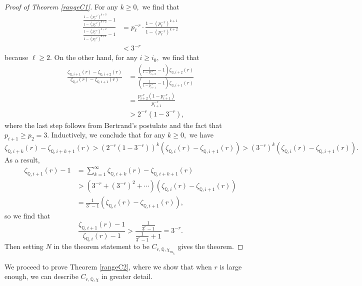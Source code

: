 \documentclass[12pt]{amsart}
\theoremstyle{definition}
\numberwithin{equation}{section}
\newcommand{\Q}{\mathbb{Q}}
\begin{document}
\begin{proof}[Proof of Theorem \ref{rangeC1}]
    For any $k \geq 0,$ we find that \begin{align*}
        \frac{ \frac{1 - (p_\ell^{-r})^{k+3}}{1 - (p_\ell^{-r})^{k+2}} - 1}{\frac{1 - (p_\ell^{-r})^{k+2}}{1 - (p_\ell^{-r})^{k+1}} - 1} 
        &= p_\ell^{-r} \cdot \frac{1 - (p_\ell^{-r})^{k+1} }{1 - (p_\ell^{-r})^{k+2}} \\
        &< 3^{-r}
    \end{align*} because $\ell \geq 2.$
    On the other hand, for any $i \geq i_0,$ we find that 
    \begin{align*}
        \frac{\zeta_{\Q,i+1}(r) - \zeta_{\Q,i+2}(r)}{\zeta_{\Q,i}(r) - \zeta_{\Q,i+1}(r)} &= \frac{ \left( \frac{1}{1-p_{i+2}^{-r}} -  1 \right) \zeta_{\Q,i+2}(r) }{  \left( \frac{1}{1-p_{i+1}^{-r}} -  1 \right) \zeta_{\Q,i+1}(r)  }\\
        &= \frac{p_{i+2}^{-r} (1 - p_{i+1}^{-r})}{p_{i+1}^{-r}} \\
        &> 2^{-r}(1 - 3^{-r}),
    \end{align*}
    where the last step follows from Bertrand's postulate and the fact that $p_{i+1} \geq p_2 = 3$. Inductively, we conclude that for any $k \geq 0,$ we have $$\zeta_{\Q,i+k}(r) - \zeta_{\Q,i+k+1}(r) > (2^{-r} (1 - 3^{-r}) )^k (\zeta_{\Q,i}(r) - \zeta_{\Q,i+1}(r)) > (3^{-r} )^k (\zeta_{\Q,i}(r) - \zeta_{\Q,i+1}(r)).$$ As a result, \begin{align*}
        \zeta_{\Q,i+1}(r) - 1 &= \sum_{k=1}^\infty \zeta_{\Q,i+k}(r) - \zeta_{\Q,i+k+1}(r) \\&> (3^{-r} + (3^{-r})^2 + \cdots ) (\zeta_{\Q,i}(r) - \zeta_{\Q,i+1}(r)) \\ &= \frac{1}{3^r - 1} (\zeta_{\Q,i}(r) - \zeta_{\Q,i+1}(r)),
    \end{align*}so we find that $$\frac{\zeta_{\Q,i+1}(r) - 1}{\zeta_{\Q,i}(r)- 1} > \frac{ \frac{1}{3^r - 1} }{ \frac{1}{3^r - 1} + 1} = 3^{-r}.$$ 
    Then setting $N$ in the theorem statement to be $C_{r,\Q,\chi_{m_{i_0}}}$ gives the theorem.
\end{proof}

We proceed to prove Theorem \ref{rangeC2}, where we show that when $r$ is large enough, we can describe $C_{r,\Q,\chi}$ in greater detail.
\end{document}
